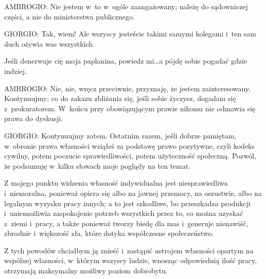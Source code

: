 \documentclass[oneside,polish,11pt,sfheadings]{mwbk}
\begin{document}
 
\noindent AMBROGIO: Nie jestem w~to w~ogóle zaangażowany; należę do sądowniczej części, a nie do ministerstwa publicznego. 




 
\noindent GIORGIO: Tak, wiem! Ale wszyscy jesteście takimi samymi kolegami i~ten sam duch ożywia was wszystkich. 

 
Jeśli denerwuje cię moja paplanina, powiedz mi\ldots a pójdę sobie pogadać gdzie indziej. 




 
\noindent AMBROGIO: Nie, nie, wręcz przeciwnie, przyznaję, że jestem zainteresowany. Kontynuujmy; co do zakazu zbliżania się,
jeśli sobie życzysz, dogadam się z~prokuratorem. W~końcu przy obowiązującym prawie nikomu nie odmawia się prawa do
dyskusji. 




 
\noindent GIORGIO: Kontynuujmy zatem. Ostatnim razem, jeśli dobrze pamiętam, w~obronie prawa własności wziąłeś za podstawę prawo
pozytywne, czyli kodeks cywilny, potem poczucie sprawiedliwości, potem użyteczność społeczną. Pozwól, że podsumuję w~kilku słowach moje poglądy na ten temat. 

 
Z mojego punktu widzenia własność indywidualna jest niesprawiedliwa i~niemoralna, ponieważ opiera się albo na jawnej
przemocy, na oszustwie, albo na legalnym wyzysku pracy innych; a to jest szkodliwe, bo przeszkadza produkcji i~uniemożliwia zaspokojenie potrzeb wszystkich przez to, co można uzyskać z~ziemi i~pracy, a także ponieważ tworzy biedę
dla mas i~generuje nienawiść, zbrodnie i~większość zła, które dotyka współczesne społeczeństwo. 

 
Z tych powodów chciałbym ją znieść i~zastąpić ustrojem własności opartym na wspólnej własności, w~którym wszyscy ludzie,
wnosząc odpowiednią ilość pracy, otrzymają maksymalny możliwy poziom dobrobytu. 
\end{document}

